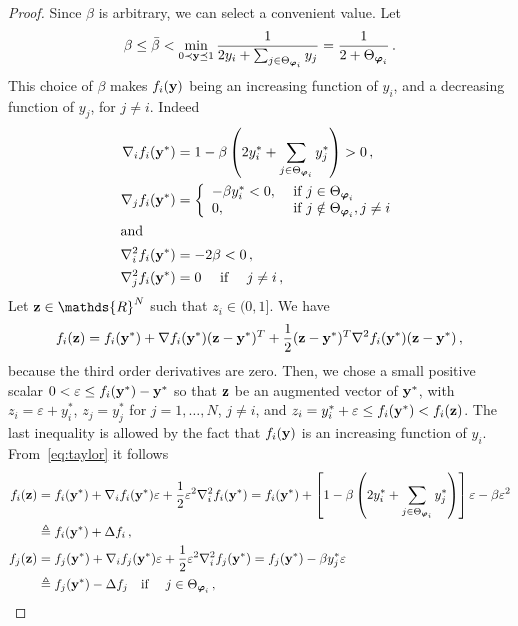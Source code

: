 \documentclass[a4paper,notitlepage,onecolumn]{article}
\def\R{\mathds{R}}
\def\y{{\bf y}}
\def\z{{\bf z}}
\def\varphib{\boldsymbol{\varphi}}
\numberwithin{equation}{section}
\begin{document}
\begin{proof}
Since $\beta$ is arbitrary, we can select a convenient value. Let
$$
\beta \leq \bar{\beta} < \min_{0 \prec \y \preceq 1} \frac{1}{2y_i+\mathop{\sum_{j\in \Theta_{\varphib_i}}}y_j} =\frac{1}{2+\Theta_{\varphib_i}} \,.
$$
This choice of $\beta$ makes $f_i(\y)$ being an increasing
function of $y_i$, and a decreasing function of $y_j$, for $j\neq
i$. Indeed
\begin{align*}
\nabla_i f_i(\y^*) &= 1-\beta\left(2y_i^* + \mathop{\sum_{j\in \Theta_{\varphib_i}}}y_j^*\right) > 0 \,,\\
\nabla_j f_i(\y^*)&= \left\{
                    \begin{array}{ll}
                      -\beta y_i^*  < 0, & \mbox{ \rm if } j\in \Theta_{\varphib_i} \\
                      0, & \mbox{ \rm if } j\notin \Theta_{\varphib_i}, j\neq i
                    \end{array}
                  \right.\\
\intertext{and}
\nabla^2_i f_i(\y^*)&= -2\beta <0 \,,\\
\nabla^2_j f_i(\y^*)&= 0 \quad  \mbox{ \rm if } \quad j\neq i \,,
\end{align*}
Let $\z\in \R^N$ such that $z_i \in (0,1]$. We have
\begin{align} \label{eq:taylor}
f_i(\z)=f_i(\y^*)+\nabla f_i(\y^*)(\z-\y^*)^T+ \frac{1}{2}(\z-\y^*)^T \nabla^2 f_i(\y^*)(\z-\y^*)\,,
\end{align}
because the third order derivatives are zero. Then, we chose a small positive scalar $0<\varepsilon \leq f_i(\y^*)-\y^*$ so that $\z$ be an augmented vector of $\y^*$, with $z_i=\varepsilon+y_i^*$, $z_j=y_j^*$ for $j=1,\ldots,N$, $j\neq i$, and $z_i =y_i^*+\varepsilon \leq f_i(\y^*) < f_i(\z)$. The last inequality is allowed by the fact that $f_i(\y)$ is an increasing function of $y_i$. From~\eqref{eq:taylor} it follows
\begin{align*}
f_i(\z) & = f_i(\y^*)+\nabla_i f_i(\y^*)\varepsilon+  \frac{1}{2}\varepsilon^2 \nabla_i^2 f_i(\y^*) = f_i(\y^*)+\left[1-\beta\left(2y_i^* + \mathop{\sum_{j\in \Theta_{\varphib_i}}}y_j^*\right) \right]\varepsilon-\beta\varepsilon^2 \\
& \triangleq f_i(\y^*) +\Delta f_i\,, \\
f_j(\z) & = f_j(\y^*)+\nabla_i f_j(\y^*)\varepsilon+  \frac{1}{2}\varepsilon^2 \nabla_i^2 f_j(\y^*) = f_j(\y^*)-\beta y_j^*\varepsilon\\
&  \triangleq f_j(\y^*) -\Delta f_j  \quad \mbox{\rm if }\quad j\in \Theta_{\varphib_i} \,, \\

\end{align*}
\end{proof}
\end{document}

